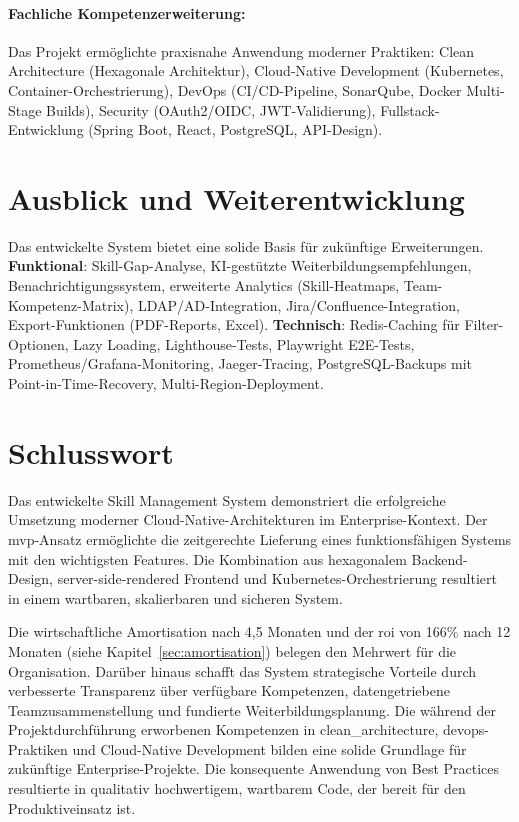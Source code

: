 \paragraph{Fachliche Kompetenzerweiterung:}
Das Projekt ermöglichte praxisnahe Anwendung moderner Praktiken: Clean Architecture (Hexagonale Architektur), Cloud-Native Development (Kubernetes, Container-Orchestrierung), DevOps (CI/CD-Pipeline, SonarQube, Docker Multi-Stage Builds), Security (OAuth2/OIDC, JWT-Validierung), Fullstack-Entwicklung (Spring Boot, React, PostgreSQL, API-Design).

\section{Ausblick und Weiterentwicklung}

Das entwickelte System bietet eine solide Basis für zukünftige Erweiterungen. \textbf{Funktional}: Skill-Gap-Analyse, KI-gestützte Weiterbildungsempfehlungen, Benachrichtigungssystem, erweiterte Analytics (Skill-Heatmaps, Team-Kompetenz-Matrix), LDAP/AD-Integration, Jira/Confluence-Integration, Export-Funktionen (PDF-Reports, Excel). \textbf{Technisch}: Redis-Caching\cite{redis_docs} für Filter-Optionen, Lazy Loading, Lighthouse\cite{lighthouse_docs}-Tests, Playwright\cite{playwright_docs} E2E-Tests, Prometheus\cite{prometheus_docs}/Grafana\cite{grafana_docs}-Monitoring, Jaeger\cite{jaeger_docs}-Tracing, PostgreSQL-Backups\cite{postgresql_backup} mit Point-in-Time-Recovery, Multi-Region-Deployment.

\section{Schlusswort}

Das entwickelte Skill Management System demonstriert die erfolgreiche Umsetzung moderner Cloud-Native-Architekturen im Enterprise-Kontext. Der \gls{mvp}-Ansatz ermöglichte die zeitgerechte Lieferung eines funktionsfähigen Systems mit den wichtigsten Features. Die Kombination aus hexagonalem Backend-Design\cite{hexagonal_architecture}, server-side-rendered Frontend und Kubernetes\cite{kubernetes_docs}-Orchestrierung resultiert in einem wartbaren, skalierbaren und sicheren System.

Die wirtschaftliche Amortisation nach 4,5 Monaten und der \gls{roi} von 166\% nach 12 Monaten (siehe Kapitel~\ref{sec:amortisation}) belegen den Mehrwert für die Organisation. Darüber hinaus schafft das System strategische Vorteile durch verbesserte Transparenz über verfügbare Kompetenzen, datengetriebene Teamzusammenstellung und fundierte Weiterbildungsplanung. Die während der Projektdurchführung erworbenen Kompetenzen in \gls{clean_architecture}, \gls{devops}-Praktiken und Cloud-Native Development bilden eine solide Grundlage für zukünftige Enterprise-Projekte. Die konsequente Anwendung von Best Practices resultierte in qualitativ hochwertigem, wartbarem Code, der bereit für den Produktiveinsatz ist.
